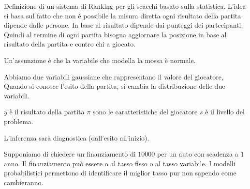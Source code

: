 \begin{esempio}
    Definizione di un sistema di Ranking per gli scacchi basato sulla statistica.
    L'idea si basa sul fatto che non è possibile la misura diretta ogni risultato
    della partita dipende dalle persone. In base al risultato dipende dai punteggi
    dei partecipanti. Quindi al termine di ogni partita bisogna aggiornare la posizione
    in base al risultato della partita e contro chi a giocato.

    Un'assunzione è che la variabile che modella la mossa è normale.

    Abbiamo due variabili gaussiane che rappresentano il valore del giocatore, Quando
    si conosce l'esito della partita, si cambia la distribuzione delle due variabili.

    $y$ è il risultato della partita
    $\pi$ sono le caratteristiche del giocatore
    $s$ è il livello del problema.

    L'inferenza sarà diagnostica (dall'esito all'inizio).
\end{esempio}

\begin{esempio}
    Supponiamo di chiedere un finanziamento di $10000$ per un auto con scadenza
    a $1$ anno. Il finanziamento può essere o al tasso fisso o al tasso variabile.
    I modelli probabilistici permettono di identificare il miglior tasso pur non
    sapendo come cambieranno.
\end{esempio}

